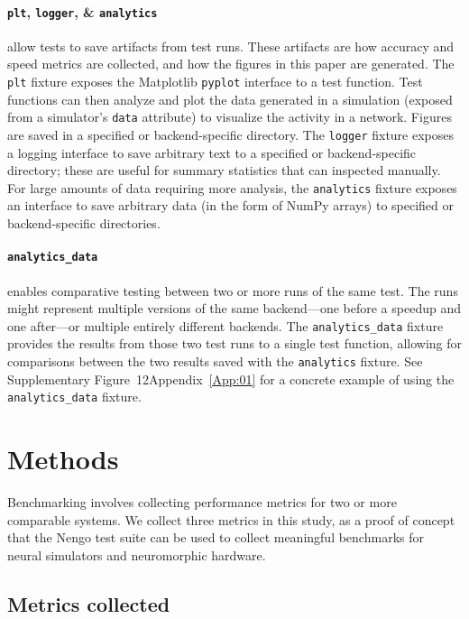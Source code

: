 \documentclass{frontiersSCNS}
\begin{document}
\paragraph{\texttt{plt}, \texttt{logger}, \& \texttt{analytics}}
allow tests to save artifacts from test runs.
These artifacts are how accuracy and speed metrics
are collected, and how the figures
in this paper are generated.
The \texttt{plt} fixture exposes the Matplotlib \citep{hunter2007}
\texttt{pyplot} interface to a test function.
Test functions can then analyze and plot
the data generated in a simulation
(exposed from a simulator's \texttt{data} attribute)
to visualize the activity in a network.
Figures are saved in a specified or backend-specific directory.
The \texttt{logger} fixture exposes a logging interface
to save arbitrary text to a specified
or backend-specific directory;
these are useful for summary statistics
that can inspected manually.
For large amounts of data
requiring more analysis,
the \texttt{analytics} fixture exposes an interface
to save arbitrary data (in the form of NumPy arrays)
to specified or backend-specific directories.

\paragraph{\texttt{analytics\_data}}
enables comparative testing between
two or more runs of the same test.
The runs might represent multiple versions
of the same backend---one before a
speedup and one after---or multiple
entirely different backends.
The \texttt{analytics\_data} fixture
provides the results from those two
test runs to a single test function,
allowing for comparisons
between the two results saved
with the \texttt{analytics} fixture.
See Supplementary Figure~12Appendix~\ref{App:01} for a
concrete example of using the
\texttt{analytics\_data} fixture.

\section{Methods}

Benchmarking involves collecting performance metrics
for two or more comparable systems.
We collect three metrics in this study,
as a proof of concept that the Nengo test suite
can be used to collect meaningful benchmarks
for neural simulators and neuromorphic hardware.

\subsection{Metrics collected}
\label{Sec:Metrics}
\end{document}
